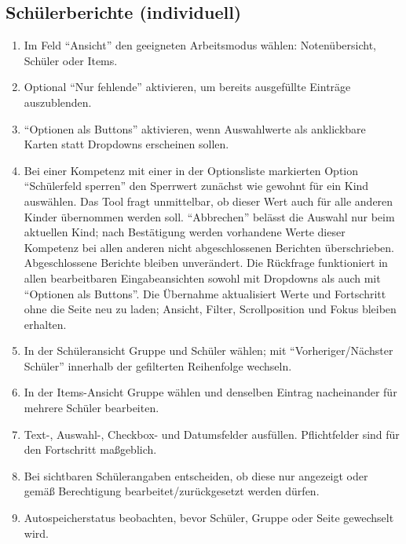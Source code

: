 \documentclass[12pt,a4paper]{article}
\begin{document}
\subsection{Schülerberichte (individuell)}\label{sec:schuelerberichte}
\begin{enumerate}
  \item Im Feld \enquote{Ansicht} den geeigneten Arbeitsmodus wählen: Notenübersicht, Schüler oder Items.
  \item Optional \enquote{Nur fehlende} aktivieren, um bereits ausgefüllte Einträge auszublenden.
  \item \enquote{Optionen als Buttons} aktivieren, wenn Auswahlwerte als anklickbare Karten statt Dropdowns erscheinen sollen.
  \item Bei einer Kompetenz mit einer in der Optionsliste markierten Option \enquote{Schülerfeld sperren} den Sperrwert zunächst wie gewohnt für ein Kind auswählen. Das Tool fragt unmittelbar, ob dieser Wert auch für alle anderen Kinder übernommen werden soll. \enquote{Abbrechen} belässt die Auswahl nur beim aktuellen Kind; nach Bestätigung werden vorhandene Werte dieser Kompetenz bei allen anderen nicht abgeschlossenen Berichten überschrieben. Abgeschlossene Berichte bleiben unverändert. Die Rückfrage funktioniert in allen bearbeitbaren Eingabeansichten sowohl mit Dropdowns als auch mit \enquote{Optionen als Buttons}. Die Übernahme aktualisiert Werte und Fortschritt ohne die Seite neu zu laden; Ansicht, Filter, Scrollposition und Fokus bleiben erhalten.
  \item In der Schüleransicht Gruppe und Schüler wählen; mit \enquote{Vorheriger/Nächster Schüler} innerhalb der gefilterten Reihenfolge wechseln.
  \item In der Items-Ansicht Gruppe wählen und denselben Eintrag nacheinander für mehrere Schüler bearbeiten.
  \item Text-, Auswahl-, Checkbox- und Datumsfelder ausfüllen. Pflichtfelder sind für den Fortschritt maßgeblich.
  \item Bei sichtbaren Schülerangaben entscheiden, ob diese nur angezeigt oder gemäß Berechtigung bearbeitet/zurückgesetzt werden dürfen.
  \item Autospeicherstatus beobachten, bevor Schüler, Gruppe oder Seite gewechselt wird.
\end{enumerate}
\end{document}
